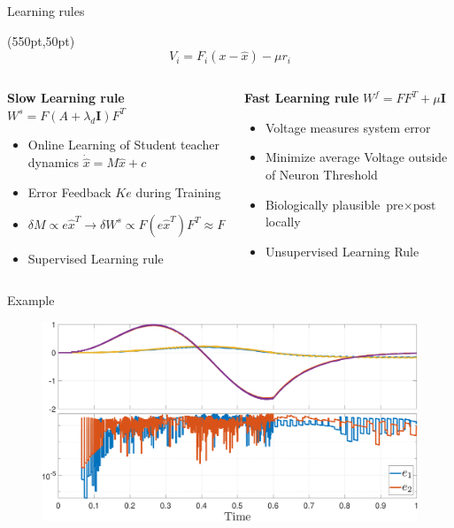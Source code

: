 \documentclass[17pt, t, lualatex]{beamer}
\begin{document}
\begin{frame}{Learning rules \cite{bourdoukan_enforcing_2015}}

	\begin{textblock*}{20pt}(550pt,50pt)
		\begin{equation*}
			V_i = F_i(x-\hat{x}) - \mu r_i
		\end{equation*}
	\end{textblock*}

	\begin{columns}
		\begin{column}{0.45\textwidth}
			\textbf{Slow Learning rule} $W^s = F(A+\lambda_d\mathbf{I})F^T$
			\begin{itemize}
				\item Online Learning of Student teacher dynamics $\dot{\hat{x}} = M\hat{x} +c$
				\item Error Feedback $Ke$ during Training
				\item $\delta M \propto e\hat{x}^T \longrightarrow \delta W^s \propto F(e\hat{x}^T)F^T \approx Fer^T$
				\item Supervised Learning rule
			\end{itemize}

		\end{column}
		\begin{column}{0.45\textwidth}
			\textbf{Fast Learning rule} $W^f = FF^T + \mu\mathbf{I}$
			\begin{itemize}
				\item Voltage measures system error
				\item Minimize average Voltage outside of Neuron Threshold
				\item Biologically plausible $\text{pre}\times\text{post}$ locally
				\item Unsupervised Learning Rule
			\end{itemize}
		\end{column}
	\end{columns}
\end{frame}


\begin{frame}{Example}
	\begin{figure}
		\includegraphics[scale = 0.45]{figures/plots/Learning/error_compare.pdf}
	\end{figure}
\end{frame}
\end{document}
